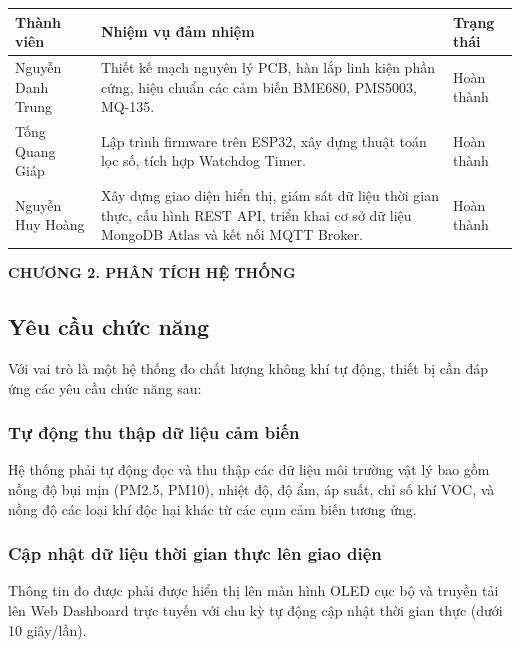 \documentclass[12pt,a4paper]{article}
\begin{document}
\begin{table}[H]
    \begin{tabularx}{\textwidth}{|l|>{\raggedright\arraybackslash}X|l|}
        \hline
        \textbf{Thành viên} & \textbf{Nhiệm vụ đảm nhiệm} & \textbf{Trạng thái} \\ 
        \hline
        Nguyễn Danh Trung & Thiết kế mạch nguyên lý PCB, hàn lắp linh kiện phần cứng, hiệu chuẩn các cảm biến BME680, PMS5003, MQ-135. & Hoàn thành \\ 
        \hline
        Tống Quang Giáp & Lập trình firmware trên ESP32, xây dựng thuật toán lọc số, tích hợp Watchdog Timer. & Hoàn thành \\ 
        \hline
        Nguyễn Huy Hoàng & Xây dựng giao diện hiển thị, giám sát dữ liệu thời gian thực, cấu hình REST API, triển khai cơ sở dữ liệu MongoDB Atlas và kết nối MQTT Broker. & Hoàn thành \\ 
        \hline
    \end{tabularx}
\end{table}

\newpage
\begin{center}
    \textbf{\Large CHƯƠNG 2. PHÂN TÍCH HỆ THỐNG}
\end{center}
\setcounter{section}{2}
\setcounter{subsection}{0}
\subsection{Yêu cầu chức năng}
Với vai trò là một hệ thống đo chất lượng không khí tự động, thiết bị cần đáp ứng các yêu cầu chức năng sau:

\subsubsection{Tự động thu thập dữ liệu cảm biến}
Hệ thống phải tự động đọc và thu thập các dữ liệu môi trường vật lý bao gồm nồng độ bụi mịn (PM2.5, PM10), nhiệt độ, độ ẩm, áp suất, chỉ số khí VOC, và nồng độ các loại khí độc hại khác từ các cụm cảm biến tương ứng.

\subsubsection{Cập nhật dữ liệu thời gian thực lên giao diện}
Thông tin đo được phải được hiển thị lên màn hình OLED cục bộ và truyền tải lên Web Dashboard trực tuyến với chu kỳ tự động cập nhật thời gian thực (dưới 10 giây/lần).
\end{document}
